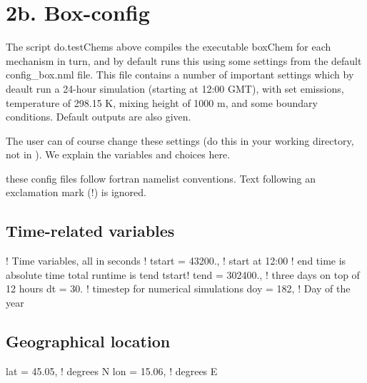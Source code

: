 \documentclass[a4paper,10pt,english]{sphinxmanual}
\begin{document}
\section{2b. Box-config}
\label{\detokenize{GenChemDoc_quickstart:b-box-config}}
The script do.testChems above compiles the executable boxChem for each mechanism in turn, and by default runs this using some settings from the default config\_box.nml file. This file contains a number of important settings which by deault run a 24-hour simulation (starting at 12:00 GMT), with set emissions, temperature of 298.15 K, mixing height of 1000 m, and some boundary conditions. Default outputs are also given.

The user can of course change these settings (do this in your working directory, not in ). We explain the variables and choices here.

 these config files follow fortran namelist conventions. Text following
an exclamation mark (!) is ignored.


\subsection{Time-related variables}
\label{\detokenize{GenChemDoc_quickstart:time-related-variables}}
\begin{sphinxVerbatim}[commandchars=\\\{\}]
! Time variables, all in seconds
! \PYGZhy{}\PYGZhy{}\PYGZhy{}\PYGZhy{}\PYGZhy{}\PYGZhy{}\PYGZhy{}\PYGZhy{}\PYGZhy{}\PYGZhy{}\PYGZhy{}\PYGZhy{}\PYGZhy{}\PYGZhy{}\PYGZhy{}\PYGZhy{}\PYGZhy{}\PYGZhy{}\PYGZhy{}\PYGZhy{}\PYGZhy{}\PYGZhy{}\PYGZhy{}\PYGZhy{}\PYGZhy{}\PYGZhy{}\PYGZhy{}\PYGZhy{}\PYGZhy{}\PYGZhy{}
 tstart = 43200., ! start at 12:00
! end time is absolute time \PYGZhy{}\PYGZgt{} total runtime is tend \PYGZhy{} tstart!
 tend = 302400.,  ! three days on top of 12 hours
 dt = 30.         ! time\PYGZhy{}step for numerical simulations
 doy = 182,        ! Day of the year
\end{sphinxVerbatim}


\subsection{Geographical location}
\label{\detokenize{GenChemDoc_quickstart:geographical-location}}
\begin{sphinxVerbatim}[commandchars=\\\{\}]
lat = 45.05,    ! degrees N
lon = 15.06,    ! degrees E
\end{sphinxVerbatim}
\end{document}
